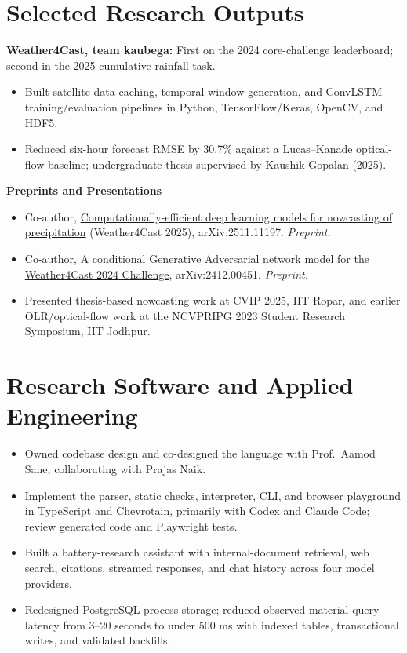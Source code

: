 \section{Selected Research Outputs}
\textbf{Weather4Cast, team kaubega:} First on the 2024 core-challenge leaderboard; second in the 2025 cumulative-rainfall task.\par
{}
\begin{itemize}
  \item Built satellite-data caching, temporal-window generation, and ConvLSTM training/evaluation pipelines in Python, TensorFlow/Keras, OpenCV, and HDF5.
  \item Reduced six-hour forecast RMSE by 30.7\% against a Lucas--Kanade optical-flow baseline; undergraduate thesis supervised by Kaushik Gopalan (2025).
\end{itemize}
\textbf{Preprints and Presentations}\par
\begin{itemize}
  \item Co-author, \href{https://arxiv.org/abs/2511.11197}{Computationally-efficient deep learning models for nowcasting of precipitation} (Weather4Cast 2025), arXiv:2511.11197. \textit{Preprint.}
  \item Co-author, \href{https://arxiv.org/abs/2412.00451}{A conditional Generative Adversarial network model for the Weather4Cast 2024 Challenge}, arXiv:2412.00451. \textit{Preprint.}
  \item Presented thesis-based nowcasting work at CVIP 2025, IIT Ropar, and earlier OLR/optical-flow work at the NCVPRIPG 2023 Student Research Symposium, IIT Jodhpur.
\end{itemize}
\section{Research Software and Applied Engineering}
\begin{itemize}
  \item Owned codebase design and co-designed the language with Prof.\ Aamod Sane, collaborating with Prajas Naik.
  \item Implement the parser, static checks, interpreter, CLI, and browser playground in TypeScript and Chevrotain, primarily with Codex and Claude Code; review generated code and Playwright tests.
\end{itemize}
\begin{itemize}
  \item Built a battery-research assistant with internal-document retrieval, web search, citations, streamed responses, and chat history across four model providers.
  \item Redesigned PostgreSQL process storage; reduced observed material-query latency from 3--20 seconds to under 500 ms with indexed tables, transactional writes, and validated backfills.
\end{itemize}
